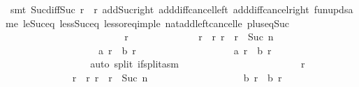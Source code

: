 \begin{isabellebody}
\ {\isacharparenleft}smt\ Suc{\isacharunderscore}diff{\isacharunderscore}Suc\ {\isacartoucheopen}r{}\ {\isacharless}\ r{\isacartoucheclose}\ add{\isacharunderscore}Suc{\isacharunderscore}right\ add{\isacharunderscore}diff{\isacharunderscore}cancel{\isacharunderscore}left{\isacharprime}\ add{\isacharunderscore}diff{\isacharunderscore}cancel{\isacharunderscore}right{\isacharprime}\ fun{\isacharunderscore}upd{\isacharunderscore}same\ le{\isacharunderscore}Suc{\isacharunderscore}eq\ less{\isacharunderscore}Suc{\isacharunderscore}eq\ less{\isacharunderscore}or{\isacharunderscore}eq{\isacharunderscore}imp{\isacharunderscore}le\ nat{\isacharunderscore}add{\isacharunderscore}left{\isacharunderscore}cancel{\isacharunderscore}le\ plus{\isacharunderscore}{}{\isacharunderscore}eq{\isacharunderscore}Suc{\isacharparenright}\isanewline
\ \ \ \ \ \ \ \ \ \ \ \ \isamarkupfalse%
\isanewline
\ \ \ \ \ \ \ \ \ \ \isamarkupfalse%
\isanewline
\ \ \ \ \ \ \ \ \ \ \ \ \isamarkupfalse%
\ r\isanewline
\ \ \ \ \ \ \ \ \ \ \ \ \isamarkupfalse%
\ {\isachardoublequoteopen}r{}\ {\isacharless}\ r{\isachardoublequoteclose}\ {\isachardoublequoteopen}r\ {\isacharless}\ r{}\ {\isacharplus}\ Suc\ n{\isachardoublequoteclose}\isanewline
\ \ \ \ \ \ \ \ \ \ \ \ \ \ \ \ \ \ \ {\isachardoublequoteopen}{\isacharquery}a\ r\ {\isasymnoteq}\ {\isacharquery}b\ {\isacharparenleft}r\ {\isacharminus}\ {}{\isacharparenright}\ {\isacharplus}\ {}{\isachardoublequoteclose}\isanewline
\ \ \ \ \ \ \ \ \ \ \ \ \isamarkupfalse%
\ \isamarkupfalse%
\ {\isachardoublequoteopen}{\isacharquery}a\ r\ {\isacharequal}\ {\isacharquery}b\ {\isacharparenleft}r\ {\isacharminus}\ {}{\isacharparenright}{\isachardoublequoteclose}\isanewline
\ \ \ \ \ \ \ \ \ \ \ \ \ \ \isamarkupfalse%
\ {\isacharasterisk}\isanewline
\ \ \ \ \ \ \ \ \ \ \ \ \ \ \isamarkupfalse%
\ {\isacharparenleft}auto\ split{\isacharcolon}\ if{\isacharunderscore}split{\isacharunderscore}asm{\isacharparenright}\isanewline
\ \ \ \ \ \ \ \ \ \ \isamarkupfalse%
\isanewline
\ \ \ \ \ \ \ \ \ \ \ \ \isamarkupfalse%
\ r\isanewline
\ \ \ \ \ \ \ \ \ \ \ \ \isamarkupfalse%
\ {\isachardoublequoteopen}r{}\ {\isacharless}\ r{\isachardoublequoteclose}\ {\isachardoublequoteopen}r\ {\isacharless}\ r{}\ {\isacharplus}\ Suc\ n{\isachardoublequoteclose}\isanewline
\ \ \ \ \ \ \ \ \ \ \ \ \ \ \ \ \ \ \ {\isachardoublequoteopen}{\isacharquery}b\ r\ {\isasymnoteq}\ {\isacharquery}b\ {\isacharparenleft}r\ {\isacharminus}\ {}{\isacharparenright}\ {\isacharplus}\ {}{\isachardoublequoteclose}\isanewline

\end{isabellebody}
